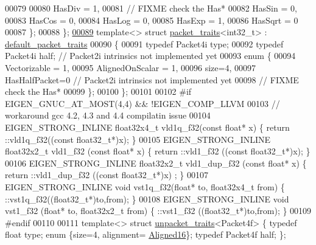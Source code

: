 \begin{DoxyCode}
{00079    
00080     HasDiv  = 1,
00081     \textcolor{comment}{// FIXME check the Has*}
00082     HasSin  = 0,
00083     HasCos  = 0,
00084     HasLog  = 0,
00085     HasExp  = 1,
00086     HasSqrt = 0
00087   \};
00088 \};
\hyperlink{struct_eigen_1_1internal_1_1packet__traits_3_01int32__t_01_4}{00089} \textcolor{keyword}{template}<> \textcolor{keyword}{struct }\hyperlink{struct_eigen_1_1internal_1_1packet__traits}{packet\_traits}<int32\_t>    : \hyperlink{struct_eigen_1_1internal_1_1default__packet__traits}{default\_packet\_traits}
00090 \{
00091   \textcolor{keyword}{typedef} Packet4i type;
00092   \textcolor{keyword}{typedef} Packet4i half; \textcolor{comment}{// Packet2i intrinsics not implemented yet}
00093   \textcolor{keyword}{enum} \{
00094     Vectorizable = 1,
00095     AlignedOnScalar = 1,
00096     size=4,
00097     HasHalfPacket=0 \textcolor{comment}{// Packet2i intrinsics not implemented yet}
00098     \textcolor{comment}{// FIXME check the Has*}
00099   \};
00100 \};
00101 
00102 \textcolor{preprocessor}{#if EIGEN\_GNUC\_AT\_MOST(4,4) && !EIGEN\_COMP\_LLVM}
00103 \textcolor{comment}{// workaround gcc 4.2, 4.3 and 4.4 compilatin issue}
00104 EIGEN\_STRONG\_INLINE float32x4\_t vld1q\_f32(\textcolor{keyword}{const} \textcolor{keywordtype}{float}* x) \{ return ::vld1q\_f32((\textcolor{keyword}{const} float32\_t*)x); \}
00105 EIGEN\_STRONG\_INLINE float32x2\_t vld1\_f32 (\textcolor{keyword}{const} \textcolor{keywordtype}{float}* x) \{ return ::vld1\_f32 ((\textcolor{keyword}{const} float32\_t*)x); \}
00106 EIGEN\_STRONG\_INLINE float32x2\_t vld1\_dup\_f32 (\textcolor{keyword}{const} \textcolor{keywordtype}{float}* x) \{ return ::vld1\_dup\_f32 ((\textcolor{keyword}{const} float32\_t*)x)
      ; \}
00107 EIGEN\_STRONG\_INLINE \textcolor{keywordtype}{void}        vst1q\_f32(\textcolor{keywordtype}{float}* to, float32x4\_t from) \{ ::vst1q\_f32((float32\_t*)to,from); 
      \}
00108 EIGEN\_STRONG\_INLINE \textcolor{keywordtype}{void}        vst1\_f32 (\textcolor{keywordtype}{float}* to, float32x2\_t from) \{ ::vst1\_f32 ((float32\_t*)to,from); 
      \}
00109 \textcolor{preprocessor}{#endif}
00110 
00111 \textcolor{keyword}{template}<> \textcolor{keyword}{struct }\hyperlink{struct_eigen_1_1internal_1_1unpacket__traits}{unpacket\_traits}<Packet4f> \{ \textcolor{keyword}{typedef} \textcolor{keywordtype}{float}   type; \textcolor{keyword}{enum} \{size=4, alignment=
      \hyperlink{group__enums_gga45fe06e29902b7a2773de05ba27b47a1af8e2bf74b04c02199f62c5e3c06dbfcc}{Aligned16}\}; \textcolor{keyword}{typedef} Packet4f half; \};
}
\end{DoxyCode}
